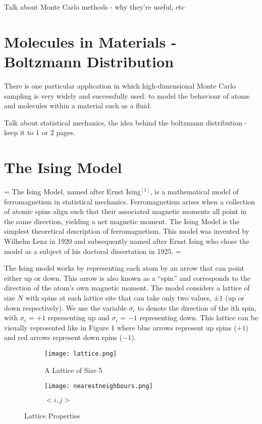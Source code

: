 \documentclass[a4paper]{article}
\begin{document}
Talk about Monte Carlo methods - why they're useful, etc

\section{Molecules in Materials - Boltzmann Distribution}

There is one particular application in which high-dimensional Monte Carlo sampling is very widely and successfully used: to model the behaviour of atoms and molecules within a material such as a fluid.

Talk about statistical mechanics, the idea behind the boltzmann distribution - keep it to 1 or 2 pages.

\section{The Ising Model}
\parskip = \baselineskip
The Ising Model, named after Ernst Ising$^{[1]}$, is a mathematical model of ferromagnetism in statistical mechanics. Ferromagnetism arises when a collection of atomic spins align such that their associated magnetic moments all point in the same direction, yielding a net magnetic moment. The Ising Model is the simplest theoretical description of ferromagnetism. This model was invented by Wilhelm Lenz in 1920 and subsequently named after Ernst Ising who chose the model as a subject of his doctoral dissertation in 1925.
\parskip = \baselineskip

The Ising model works by representing each atom by an arrow that can point either up or down. This arrow
is also known as a “spin” and corresponds to the direction of the atom’s own magnetic moment. The model considers a lattice of size $N$ with spins at each lattice site that can
take only two values, ±$1$ (up or down respectively). We use the variable $\sigma_{i}$ to denote the
direction of the ith spin, with $\sigma_{i}$ = $+1$ representing up and  $\sigma_{i}$ = $-1$ representing down.
This lattice can be visually represented like in Figure 1 where blue arrows represent up spins ($+1$) and
red arrows represent down spins ($-1$).

\begin{figure}[h]
\centering
\begin{subfigure}{0.3\textwidth}
\texttt{[image: lattice.png]} 
\caption{A Lattice of Size 5}
\label{fig:subim1}
\end{subfigure}
\hspace{1cm}
\begin{subfigure}{0.2\textwidth}
\texttt{[image: nearestneighbours.png]}
\vspace{0.6cm}
\caption{$<i, j>$}
\label{fig:subim2}
\end{subfigure}
\caption{Lattice Properties}
\label{fig:image2}
\end{figure}
\end{document}
